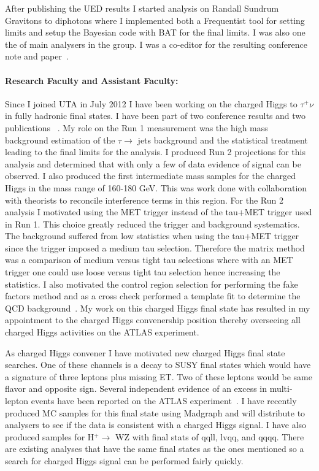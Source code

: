 After publishing the UED results I started analysis on Randall Sundrum Gravitons to diphotons where I implemented both a Frequentist tool for setting limits and setup the Bayesian code with BAT for the final limits.  I was
also one the of main analysers in the group.  I was a co-editor for the resulting conference note and paper~\cite{atl1,atl1-conf}.

\paragraph{Research Faculty and Assistant Faculty:}Since I joined UTA in July 2012 I have been working on the charged Higgs to $\tau^+\nu$ in fully hadronic final states.  I have been part of two conference results and two publications ~\cite{hptnu,atl2014,taunu,hptnu1}.
My role on the Run 1 measurement was the high mass background estimation of the $\tau \rightarrow$ jets background and the statistical treatment leading to the final 
limits for the analysis.  I produced Run 2 projections for this analysis and determined that with only a few \invfb of data evidence of signal can be observed.
I also produced the first intermediate mass samples for the charged Higgs in the mass range of 160-180 GeV.  This was work done with collaboration with theorists to reconcile interference terms in this region. 
For the Run 2 analysis I motivated using the MET trigger instead of the tau+MET trigger used in Run 1.  This choice greatly reduced the trigger and background systematics.  
The background suffered from low statistics when using the tau+MET trigger since the trigger imposed a medium tau selection.  Therefore the matrix method was a comparison
of medium versus tight tau selections where with an MET trigger one could use loose versus tight tau selection hence increasing the statistics.  I also motivated the control region selection
for performing the fake factors method and as a cross check performed a template fit to determine the QCD background~\cite{taunu,hptnu1}.
My work on this charged Higgs final state has resulted in my appointment to the charged Higgs convenership position thereby overseeing all charged Higgs activities on the ATLAS experiment.  

As charged Higgs convener I have motivated new charged Higgs final state searches.  One of these channels is a decay to SUSY final states which would have a signature of three leptons plus missing ET.  Two
of these leptons would be same flavor and opposite sign.  Several independent evidence of an excess in multi-lepton events have been reported on the ATLAS experiment~\cite{3lep}.  I have recently produced MC samples for this final state
using Madgraph and will distribute to analysers to see if the data is consistent with a charged Higgs signal. I have also produced samples for H$^+ \rightarrow$ WZ with final stats of qqll, lvqq, and qqqq.  There are existing analyses that have the same final states as the ones mentioned so a search for charged Higgs signal can be performed fairly quickly.

